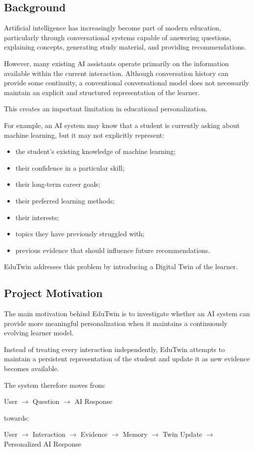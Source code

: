 \documentclass[12pt,a4paper]{article}
\begin{document}
\subsection{Background}
Artificial intelligence has increasingly become part of modern education, particularly through conversational systems capable of answering questions, explaining concepts, generating study material, and providing recommendations.

However, many existing AI assistants operate primarily on the information available within the current interaction. Although conversation history can provide some continuity, a conventional conversational model does not necessarily maintain an explicit and structured representation of the learner.

This creates an important limitation in educational personalization.

For example, an AI system may know that a student is currently asking about machine learning, but it may not explicitly represent:
\begin{itemize}[noitemsep,topsep=2pt]
    \item the student's existing knowledge of machine learning;
    \item their confidence in a particular skill;
    \item their long-term career goals;
    \item their preferred learning methods;
    \item their interests;
    \item topics they have previously struggled with;
    \item previous evidence that should influence future recommendations.
\end{itemize}

EduTwin addresses this problem by introducing a Digital Twin of the learner.

\subsection{Project Motivation}
The main motivation behind EduTwin is to investigate whether an AI system can provide more meaningful personalization when it maintains a continuously evolving learner model.

Instead of treating every interaction independently, EduTwin attempts to maintain a persistent representation of the student and update it as new evidence becomes available.

The system therefore moves from:
\begin{center}
    User $\rightarrow$ Question $\rightarrow$ AI Response
\end{center}
towards:
\begin{center}
    User $\rightarrow$ Interaction $\rightarrow$ Evidence $\rightarrow$ Memory $\rightarrow$ Twin Update $\rightarrow$ Personalized AI Response
\end{center}
\end{document}
